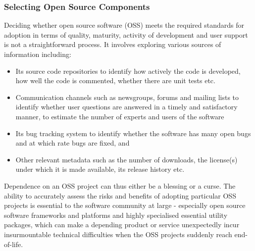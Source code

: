 \subsubsection{Selecting Open Source Components}
Deciding whether open source software (OSS) meets the required standards for adoption in terms of quality, maturity, activity of development and user support is not a straightforward process. It involves exploring various sources of information including:
\begin{itemize}
\item Its source code repositories to identify how actively the code is developed, how well the code is commented, whether there are unit tests etc.

\item Communication channels such as newsgroups, forums and mailing lists to identify whether user questions are answered in a timely and satisfactory manner, to estimate the number of experts and users of the software

\item Its bug tracking system to identify whether the software has many open bugs and at which rate bugs are fixed, and

\item Other relevant metadata such as the number of downloads, the license(s) under which it is made available, its release history etc.
\end{itemize}
Dependence on an OSS project can thus either be a blessing or a curse. The ability to accurately assess the risks and benefits of adopting particular OSS projects is essential to the software community at large - especially open source software frameworks and platforms and highly specialised essential utility packages, which can make a depending product or service unexpectedly incur insurmountable technical difficulties when the OSS projects suddenly reach end-of-life.

